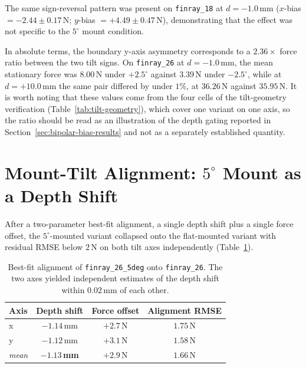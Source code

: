 The same sign-reversal pattern was present on \texttt{finray\_18} at
$d = -1.0$\,mm ($x$-bias $= -2.44 \pm 0.17$\,N; $y$-bias
$= +4.49 \pm 0.47$\,N), demonstrating that the effect was not specific to
the $5^{\circ}$ mount condition.

In absolute terms, the boundary y-axis asymmetry corresponds to a
$2.36\times$ force ratio between the two tilt signs. On
\texttt{finray\_26} at $d=-1.0$\,mm, the mean stationary force was
$8.00$\,N under $+2.5^{\circ}$ against $3.39$\,N under $-2.5^{\circ}$,
while at $d=+10.0$\,mm the same pair differed by under $1\%$, at
$36.26$\,N against $35.95$\,N. It is worth noting that these values
come from the four cells of the tilt-geometry verification
(Table~\ref{tab:tilt-geometry}), which cover one variant on one axis,
so the ratio should be read as an illustration of the depth gating
reported in Section~\ref{sec:bipolar-bias-results} and not as a
separately established quantity.

\section{Mount-Tilt Alignment: $5^{\circ}$ Mount as a Depth Shift}
\label{sec:mount-tilt-results}

After a two-parameter best-fit alignment, a single depth shift plus a
single force offset, the $5^{\circ}$-mounted variant collapsed onto
the flat-mounted variant with residual RMSE below $2$\,N on both tilt
axes independently (Table~\ref{tab:mount-tilt-alignment}).

\begin{table}[ht]
\centering
\caption[Mount tilt equivalence]{Best-fit alignment of
\texttt{finray\_26\_5deg} onto \texttt{finray\_26}. The two axes yielded
independent estimates of the depth shift within $0.02$\,mm of each other.}
\label{tab:mount-tilt-alignment}
\begin{tabular}{lccc}
\toprule
Axis & Depth shift & Force offset & Alignment RMSE \\
\midrule
x     & $-1.14$\,mm & $+2.7$\,N & $1.75$\,N \\
y     & $-1.12$\,mm & $+3.1$\,N & $1.58$\,N \\
\emph{mean} & $\mathbf{-1.13}$\,\textbf{mm} & $+2.9$\,N & $1.66$\,N \\
\bottomrule
\end{tabular}
\end{table}
